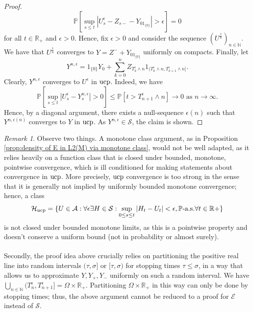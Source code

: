\documentclass[11pt,a4paper,twoside,openany]{report}
\numberwithin{equation}{section}
\theoremstyle{plain} %
\theoremstyle{definition} %
\theoremstyle{remark} %
\newtheorem{remark}[theorem]{Remark}
\begin{document}
\begin{proof}
\begin{equation*}
    \mathbb{P}[\sup_{s\leq t}|U^{\epsilon}_s-Z_{s-}-Y_01_{\{0\}}|>\epsilon]=0
\end{equation*}
for all \(t\in\mathbb{R}_+\) and \(\epsilon>0\). Hence, fix \(\epsilon>0\) and consider the sequence \((U^{\frac{1}{n}})_{n\in\mathbb{N}}\). We have that \(U^{\frac{1}{n}}\) converges to \(Y=Z^-+Y_01_{\{0\}}\) uniformly on compacts. Finally, let 
 \begin{equation*}
        Y^{n,\epsilon}=1_{\{0\}}Y_0+\sum_{k=0 }^nZ_{T_k^{\epsilon}\wedge n}1_{(T_{k}^{\epsilon}\wedge n,T_{k+1}^{\epsilon}\wedge n]}.
    \end{equation*}
Clearly, \(Y^{n,\epsilon}\) converges to \(U^{\epsilon}\) in \(\rm{ucp}\). Indeed, we have
\begin{equation*}
    \mathbb{P}[\sup_{s\leq t}|U_s^{\epsilon}-Y_s^{n,\epsilon}|>0]\leq \mathbb{P}[t>T_{n+1}^\epsilon\wedge n]\to 0 \text{ as }n\to\infty.
\end{equation*}
Hence, by a diagonal argument, there exists a null-sequence \(\epsilon(n)\) such that \(Y^{n,\epsilon(n)}\) converges to \(Y\) in \(\rm{ucp}\).
As \(Y^{n,\epsilon}\in\mathcal{S}\), the claim is shown.
\end{proof}
\begin{remark}
Observe two things. A monotone class argument, as in Proposition \ref{prop:density of E in L2(M) via monotone class}, would not be well adapted, as it relies heavily on a function class that is closed under bounded, monotone, pointwise convergence, which is ill conditioned for making statements about convergence in \(\rm{ucp}\). More precisely, \(\rm{ucp}\) convergence is too strong in the sense that it is generally not implied by uniformly bounded monotone convergence; hence, a class \begin{equation*}
    \mathcal{H}_{\rm{ucp}}=\{ U \in \mathcal{A}:\forall \epsilon\exists H\in\mathcal{S}:\sup_{0\leq s\leq t}|H_t-U_t|<\epsilon, \mathbb{P}\text{-a.s.} \forall t\in\mathbb{R}+\}
\end{equation*} 
is not closed under bounded monotone limits, as this is a pointwise property and doesn't conserve a uniform bound (not in probability or almost surely). \\\\
Secondly, the proof idea above crucially relies on partitioning the positive real line into random intervals \((\tau,\sigma]\) or \([\tau,\sigma)\) for stopping times \(\tau\leq\sigma\), in a way that allows us to approximate \(Y,Y_+,Y_-\) uniformly on such a random interval. We have \(\bigcup_{n\in\mathbb{N}} (T_n^{\epsilon},T_{n+1}^{\epsilon}]=\Omega\times\mathbb{R}_+\). Partitioning \(\Omega\times\mathbb{R}_+\) in this way can only be done by stopping times; thus, the above argument cannot be reduced to a proof for \(\mathcal{E}\) instead of \(\mathcal{S}\).
\end{remark}
\end{document}
